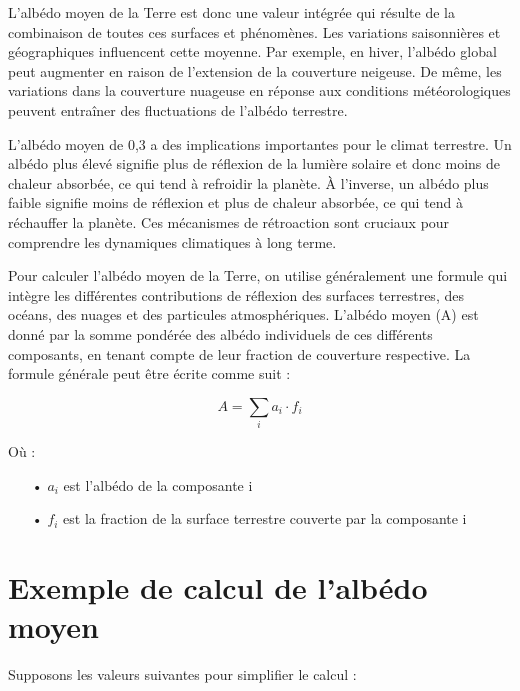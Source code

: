 \documentclass[a4paper,11pt]{article}
\begin{document}
L'albédo moyen de la Terre est donc une valeur intégrée qui résulte de la combinaison de toutes ces surfaces et phénomènes. Les variations saisonnières et géographiques influencent cette moyenne. Par exemple, en hiver, l'albédo global peut augmenter en raison de l'extension de la couverture neigeuse. De même, les variations dans la couverture nuageuse en réponse aux conditions météorologiques peuvent entraîner des fluctuations de l'albédo terrestre.

L'albédo moyen de 0,3 a des implications importantes pour le climat terrestre. Un albédo plus élevé signifie plus de réflexion de la lumière solaire et donc moins de chaleur absorbée, ce qui tend à refroidir la planète. À l'inverse, un albédo plus faible signifie moins de réflexion et plus de chaleur absorbée, ce qui tend à réchauffer la planète. Ces mécanismes de rétroaction sont cruciaux pour comprendre les dynamiques climatiques à long terme.


Pour calculer l'albédo moyen de la Terre, on utilise généralement une formule qui intègre les différentes contributions de réflexion des surfaces terrestres, des océans, des nuages et des particules atmosphériques. L'albédo moyen (A) est donné par la somme pondérée des albédo individuels de ces différents composants, en tenant compte de leur fraction de couverture respective. La formule générale peut être écrite comme suit :

\[ A = \displaystyle\sum_i a_i \cdot f_i \]

Où :
\begin{enumerate}

\item[•] $a_i$ est l'albédo de la composante i
\item[•] $f_i$ est la fraction de la surface terrestre couverte par la composante i

\end{enumerate}


\section{Exemple de calcul de l'albédo moyen}


Supposons les valeurs suivantes pour simplifier le calcul :
\end{document}

